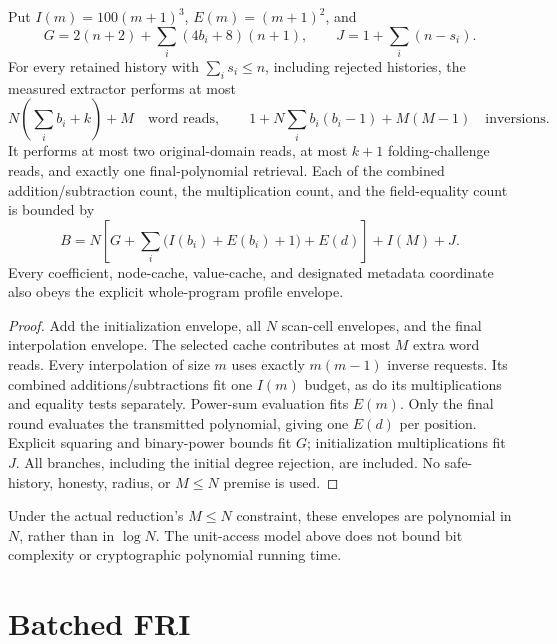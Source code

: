 \begin{theorem}\label{thm:fri-extractor-resources}
\leanok
{}
Put $I(m)=100(m+1)^3$, $E(m)=(m+1)^2$, and
\[
  G=2(n+2)+\sum_i(4b_i+8)(n+1),\qquad
  J=1+\sum_i(n-s_i).
\]
For every retained history with $\sum_i s_i\leq n$, including rejected
histories, the measured extractor performs at most
\[
  N\left(\sum_i b_i+k\right)+M
  \quad\text{word reads},\qquad
  1+N\sum_i b_i(b_i-1)+M(M-1)
  \quad\text{inversions}.
\]
It performs at most two original-domain reads, at most $k+1$ folding-challenge
reads, and exactly one final-polynomial retrieval. Each of the combined
addition/subtraction count, the multiplication count, and the field-equality
count is bounded by
\[
  B=N\left[G+\sum_i\bigl(I(b_i)+E(b_i)+1\bigr)+E(d)\right]+I(M)+J.
\]
Every coefficient, node-cache, value-cache, and designated metadata coordinate
also obeys the explicit whole-program profile envelope.
\end{theorem}
\begin{proof}
\leanok
Add the initialization envelope, all $N$ scan-cell envelopes, and the final
interpolation envelope. The selected cache contributes at most $M$ extra word
reads. Every interpolation of size $m$ uses exactly $m(m-1)$ inverse requests.
Its combined additions/subtractions fit one $I(m)$ budget, as do its
multiplications and equality tests separately. Power-sum evaluation fits $E(m)$.
Only the final round evaluates the transmitted polynomial, giving one $E(d)$
per position. Explicit squaring and binary-power bounds fit $G$; initialization
multiplications fit $J$. All branches, including the initial degree rejection,
are included. No safe-history, honesty, radius, or $M\leq N$ premise is used.
\end{proof}

Under the actual reduction's $M\leq N$ constraint, these envelopes are
polynomial in $N$, rather than in $\log N$. The unit-access model above does
not bound bit complexity or cryptographic polynomial running time.

\section{Batched FRI}\label{sec:batched_fri}

